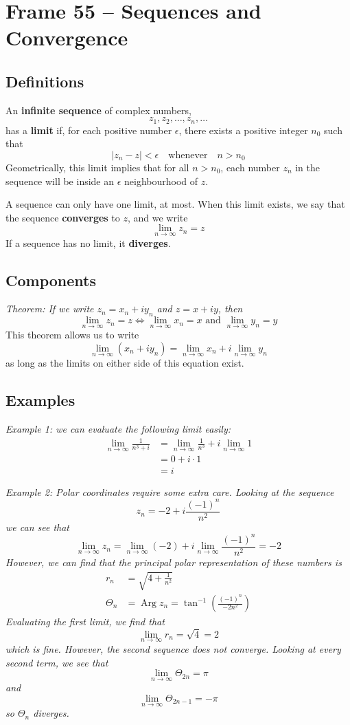 \documentclass{article}
\renewcommand{\emph}{\textbf}
\DeclareMathOperator{\Arg}{Arg}
\begin{document}
\tableofcontents

\clearpage
\section{Frame 55 -- Sequences and Convergence}
\subsection{Definitions}
An \emph{infinite sequence} of complex numbers,
\[
	z_1, z_2, \dots, z_n, \dots
\]
has a \emph{limit} if, for each positive number $\epsilon$, there exists a positive integer $n_0$ such that
\[
	|z_n - z| < \epsilon	\quad \text{whenever} \quad	n > n_0
\]
Geometrically, this limit implies that for all $n > n_0$, each number $z_n$ in the sequence will be inside an $\epsilon$ neighbourhood of $z$.

A sequence can only have one limit, at most. When this limit exists, we say that the sequence \emph{converges} to $z$, and we write
\[
	\lim_{n \to \infty} z_n = z
\]
If a sequence has no limit, it \emph{diverges}.

\subsection{Components}
\textit{Theorem: If we write $z_n = x_n + iy_n$ and $z = x + iy$, then
\[
	\lim_{n \to \infty} z_n = z \iff
	\lim_{n \to \infty} x_n = x \text{ and }
	\lim_{n \to \infty} y_n = y
\]}
This theorem allows us to write
\[
	\lim_{n \to \infty} (x_n + iy_n)
	= \lim_{n \to \infty} x_n 
	+ i \lim_{n \to \infty} y_n
\]
as long as the limits on either side of this equation exist.

\subsection{Examples}
\textit{Example 1: we can evaluate the following limit easily:
\begin{align*}
	\lim_{n \to \infty} \frac{1}{n^3 + i}
	&= \lim_{n \to \infty} \frac{1}{n^3} + i\lim_{n \to \infty} 1 \\
	&= 0 + i\cdot1 \\
	&= i
\end{align*}
}

\textit{Example 2: Polar coordinates require some extra care. Looking at the sequence
\[
	z_n = -2 + i \frac{(-1)^n}{n^2}
\]
we can see that
\[
	\lim_{n \to \infty} z_n
	= \lim_{n \to \infty} (-2)
	+ i \lim_{n \to \infty} \frac{(-1)^n}{n^2}
	= -2
\]
However, we can find that the principal polar representation of these numbers is
\begin{align*}
	r_n &= \sqrt{4 + \frac{1}{n^2}} \\
	\Theta_n &= \Arg z_n = \tan^{-1} \left( \frac{(-1)^n}{-2n^2}\right)
\end{align*}
Evaluating the first limit, we find that
\[
	\lim_{n \to \infty} r_n = \sqrt{4} = 2
\]
which is fine. However, the second sequence does not converge. Looking at every second term, we see that
\[
	\lim_{n \to \infty} \Theta_{2n} = \pi
\]
and
\[
	\lim_{n \to \infty} \Theta_{2n - 1} = -\pi
\]
so $\Theta_n$ diverges.}
\end{document}
